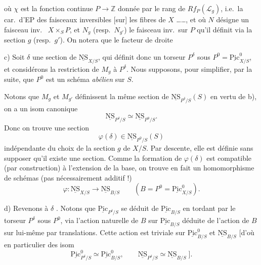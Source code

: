 \documentclass[11pt,a4paper]{article}
\begin{document}
où $\chi$ est la fonction continue $P \to \mathbb{Z}$
donnée par le rang de $Rf_P(\mathcal{L}_g)$, i.e.\ la car.\ d'EP des faisceaux
inversibles  [sur] les fibres de $X$ \ldots\ldots, et où $N$
désigne un faisceau inv.\  $X \times_S P$, et $N_g$
(resp.\ $N_{g'}$) le faisceau inv.\ sur $P$ qu'il définit via la section $g$
(resp.\ $g'$). On notera que le facteur de droite

c) Soit $\delta$ une section de $\underline{\mathrm{NS}}_{X/S}$, qui définit
donc un torseur $P^{\delta}$ sous $P^{0} = \underline{\mathrm{Pic}}^{0}_{X/S}$,
et considérons la restriction de $M_g$ à $P^{\delta}$. Nous supposons, pour
simplifier, par la suite, que $P^{0}$ est un schéma \emph{abélien} sur $S$.


Notons que $M_g$ et $M_{g'}$ définissent la même section de
$\underline{\mathrm{NS}}_{P^{\delta}/S}(S)$ en vertu de b),  on a
un isom canonique
\[
\underline{\mathrm{NS}}_{P^{\delta}/S} \simeq \underline{\mathrm{NS}}_{P^{0}/S} .
\]
Donc on trouve une section
\[
\varphi(\delta) \in \underline{\mathrm{NS}}_{P^{0}/S}(S)
\]
indépendante du choix de la section $g$ de $X/S$. Par
descente, elle est définie sans supposer qu'il existe une section. Comme la
formation de $\varphi(\delta)$ est compatible (par construction) à l'extension
de la base, on trouve en fait un homomorphisme de schémas (pas nécessairement
additif !)
\[
\boxed{\varphi : \underline{\mathrm{NS}}_{X/S} \longrightarrow \underline{\mathrm{NS}}_{B/S}}
\qquad (B = P^{0} = \underline{\mathrm{Pic}}^{0}_{X/S}).
\]

d) Revenons à $\delta$ \struck{\ill{}}. Notons que
$\underline{\mathrm{Pic}}_{P^{\delta}/S}$ se déduit de
$\underline{\mathrm{Pic}}_{B/S}$ en tordant par  le torseur
$P^{\delta}$ sous $P^{0}$, via l'action naturelle de $B$ sur
$\underline{\mathrm{Pic}}_{B/S}$ déduite de l'action de $B$ sur lui-même par
translations. \struck{\ill{}} Cette action est triviale sur
$\underline{\mathrm{Pic}}^{0}_{B/S}$ et $\underline{\mathrm{NS}}_{B/S}$ [d'où
en particulier des isom
\[
\underline{\mathrm{Pic}}^{0}_{P^{\delta}/S} \simeq \underline{\mathrm{Pic}}^{0}_{B/S} ,
\qquad
\underline{\mathrm{NS}}_{P^{\delta}/S} \simeq \underline{\mathrm{NS}}_{B/S} \;].
\]
\end{document}
